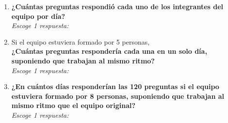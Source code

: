 \documentclass[11pt]{book}
\begin{document}
\begin{enumerate}
\begin{enumerate}

          \item \textbf{¿Cuántas preguntas respondió cada uno de los integrantes del equipo por día?}\\
                \emph{Escoge 1 respuesta:}


          \item Si el equipo estuviera formado por 5 personas, \\
                \textbf{¿Cuántas preguntas respondería cada una en un solo día, suponiendo que trabajan al mismo ritmo?}\\
                \emph{Escoge 1 respuesta:}


          \item \textbf{¿En cuántos días responderían las 120 preguntas si el equipo estuviera formado por 8 personas, suponiendo que trabajan al mismo ritmo que el equipo original?}\\
                \emph{Escoge 1 respuesta:}



\end{enumerate}
\end{enumerate}
\end{document}
